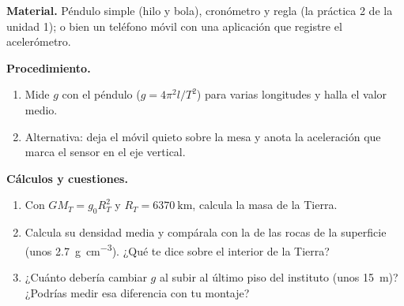 \textbf{Material.} Péndulo simple (hilo y bola), cronómetro y regla (la práctica 2 de la unidad 1); o bien un teléfono
móvil con una aplicación que registre el acelerómetro.

\textbf{Procedimiento.}
\begin{enumerate}[label=\numberballmDarkTeal]
    \item Mide \(g\) con el péndulo (\(g = 4\pi^2 l/T^2\)) para varias longitudes y halla el valor medio.
    \item Alternativa: deja el móvil quieto sobre la mesa y anota la aceleración que marca el sensor en el eje vertical.
\end{enumerate}

\textbf{Cálculos y cuestiones.}
\begin{enumerate}[label=\letraminuscula]
    \item Con \(G M_T = g_0 R_T^2\) y \(R_T = \qty{6370}{\km}\), calcula la masa de la Tierra.
    \item Calcula su densidad media y compárala con la de las rocas de la superficie (unos \qty{2.7}{\g\per\cm\cubed}).
    ¿Qué te dice sobre el interior de la Tierra?
    \item ¿Cuánto debería cambiar \(g\) al subir al último piso del instituto (unos \qty{15}{\m})? ¿Podrías medir esa diferencia
    con tu montaje?
\end{enumerate}
